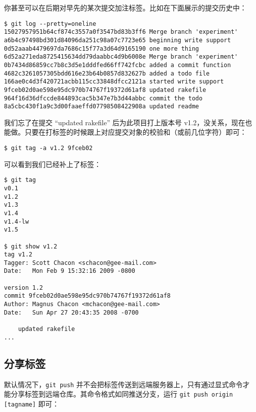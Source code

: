 \documentclass[a4paper]{book}
\begin{document}
你甚至可以在后期对早先的某次提交加注标签。比如在下面展示的提交历史中：

\begin{shaded}\begin{verbatim}
$ git log --pretty=oneline
15027957951b64cf874c3557a0f3547bd83b3ff6 Merge branch 'experiment'
a6b4c97498bd301d84096da251c98a07c7723e65 beginning write support
0d52aaab4479697da7686c15f77a3d64d9165190 one more thing
6d52a271eda8725415634dd79daabbc4d9b6008e Merge branch 'experiment'
0b7434d86859cc7b8c3d5e1dddfed66ff742fcbc added a commit function
4682c3261057305bdd616e23b64b0857d832627b added a todo file
166ae0c4d3f420721acbb115cc33848dfcc2121a started write support
9fceb02d0ae598e95dc970b74767f19372d61af8 updated rakefile
964f16d36dfccde844893cac5b347e7b3d44abbc commit the todo
8a5cbc430f1a9c3d00faaeffd07798508422908a updated readme
\end{verbatim}\end{shaded}

我们忘了在提交 “updated rakefile” 后为此项目打上版本号 v1.2，没关系，现在也能做。只要在打标签的时候跟上对应提交对象的校验和（或前几位字符）即可：

\begin{shaded}\begin{verbatim}
$ git tag -a v1.2 9fceb02
\end{verbatim}\end{shaded}

可以看到我们已经补上了标签：

\begin{shaded}\begin{verbatim}
$ git tag
v0.1
v1.2
v1.3
v1.4
v1.4-lw
v1.5

$ git show v1.2
tag v1.2
Tagger: Scott Chacon <schacon@gee-mail.com>
Date:   Mon Feb 9 15:32:16 2009 -0800

version 1.2
commit 9fceb02d0ae598e95dc970b74767f19372d61af8
Author: Magnus Chacon <mchacon@gee-mail.com>
Date:   Sun Apr 27 20:43:35 2008 -0700

    updated rakefile
...
\end{verbatim}\end{shaded}

\subsection{分享标签}

默认情况下，\texttt{git push} 并不会把标签传送到远端服务器上，只有通过显式命令才能分享标签到远端仓库。其命令格式如同推送分支，运行 \texttt{git push origin {[}tagname{]}} 即可：
\end{document}
